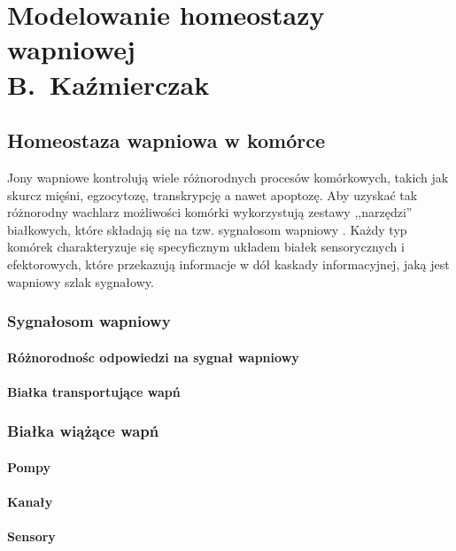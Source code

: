 \chapter[Modelowanie wapnia komórkowego]{Modelowanie homeostazy wapniowej\\{\Large B.~Kaźmierczak}}

\section{Homeostaza wapniowa w komórce}

Jony wapniowe kontrolują wiele różnorodnych procesów komórkowych, takich jak skurcz mięśni, egzocytozę, transkrypcję a nawet apoptozę. Aby uzyskać tak różnorodny wachlarz możliwości komórki wykorzystują zestawy ,,narzędzi'' białkowych, które składają się na tzw. sygnałosom wapniowy \cite{Berridge2012}. Każdy typ komórek charakteryzuje się specyficznym układem białek sensorycznych i efektorowych, które przekazują informacje w dół kaskady informacyjnej, jaką jest wapniowy szlak sygnałowy.




\subsection{Sygnałosom wapniowy}



	\subsubsection{Różnorodnośc odpowiedzi na sygnał wapniowy}
	\subsubsection{Białka transportujące wapń}

\subsection{Białka wiążące wapń}

	\subsubsection{Pompy}
	\subsubsection{Kanały}
	\subsubsection{Sensory}
